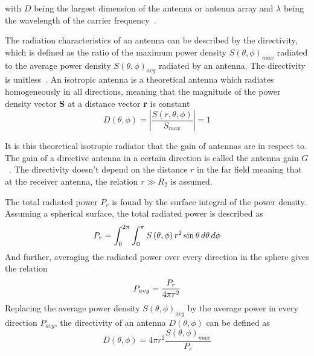 with $D$ being the largest dimension of the antenna or antenna array and $\lambda$ being the wavelength of the carrier frequency~\cite[p. 4]{ant_beam_form}.

The radiation characteristics of an antenna can be described by the directivity, which is defined as the ratio of the maximum power density $S\left( \theta, \phi \right)_{max}$ radiated to the average power density $S\left( \theta, \phi \right)_{avg}$ radiated by an antenna. The directivity is unitless~\cite[p. 63]{direct_energy}. An isotropic antenna is a theoretical antenna which radiates homogeneously in all directions, meaning that the magnitude of the power density vector \textbf{S} at a distance vector \textbf{r} is constant
\begin{equation} \label{eq:isotropic_radiation}
    D\left( \theta, \phi \right) = \left| \frac{S \left(r, \theta, \phi \right)}{S_{max}} \right|=1
\end{equation}

It is this theoretical isotropic radiator that the gain of antennas are in respect to. The gain of a directive antenna in a certain direction is called the antenna gain $G$~\cite[p. 12]{ant_beam_form}. The directivity doesn't depend on the distance $r$ in the far field meaning that at the receiver antenna, the relation $r \gg  R_2$ is assumed. 

The total radiated power $P_{r}$ is found by the surface integral of the power density. Assuming a spherical surface, the total radiated power is described as
\begin{equation} \label{eq:surface_integral}
    P_{r} = \int_{0}^{2 \pi} \int_{0}^{\pi} S\left( \theta, \phi \right) r^2 \sin \theta \, d\theta \, d\phi
    \tagaddtext{[\si{\watt}]}
\end{equation}
And further, averaging the radiated power over every direction in the sphere gives the relation
\begin{equation} \label{eq:average_power}
    P_{avg} = \frac{P_{r}}{4 \pi r^2}
    \tagaddtext{[\si{\watt\per\meter\squared}]}
\end{equation}
Replacing the average power density $S\left( \theta, \phi \right)_{avg}$ by the average power in every direction $P_{avg}$, the directivity of an antenna $D\left(\theta, \phi\right)$ can be defined as 
\begin{equation} \label{eq:directivity}
    D\left(\theta, \phi\right) = 4 \pi r^2 \frac{S \left(\theta, \phi\right)_{max}}{P_{r}}
\end{equation}

